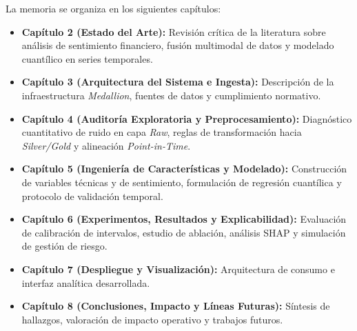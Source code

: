 \documentclass[11pt, a4paper]{report}
\begin{document}
La memoria se organiza en los siguientes capítulos:
\begin{itemize}
    \item \textbf{Capítulo 2 (Estado del Arte):} Revisión crítica de la literatura sobre análisis de sentimiento financiero, fusión multimodal de datos y modelado cuantílico en series temporales.
    \item \textbf{Capítulo 3 (Arquitectura del Sistema e Ingesta):} Descripción de la infraestructura \textit{Medallion}, fuentes de datos y cumplimiento normativo.
    \item \textbf{Capítulo 4 (Auditoría Exploratoria y Preprocesamiento):} Diagnóstico cuantitativo de ruido en capa \textit{Raw}, reglas de transformación hacia \textit{Silver/Gold} y alineación \textit{Point-in-Time}.
    \item \textbf{Capítulo 5 (Ingeniería de Características y Modelado):} Construcción de variables técnicas y de sentimiento, formulación de regresión cuantílica y protocolo de validación temporal.
    \item \textbf{Capítulo 6 (Experimentos, Resultados y Explicabilidad):} Evaluación de calibración de intervalos, estudio de ablación, análisis SHAP y simulación de gestión de riesgo.
    \item \textbf{Capítulo 7 (Despliegue y Visualización):} Arquitectura de consumo e interfaz analítica desarrollada.
    \item \textbf{Capítulo 8 (Conclusiones, Impacto y Líneas Futuras):} Síntesis de hallazgos, valoración de impacto operativo y trabajos futuros.
\end{itemize}

% 
% 
% 
% 
% 
% 
% 
\end{document}

